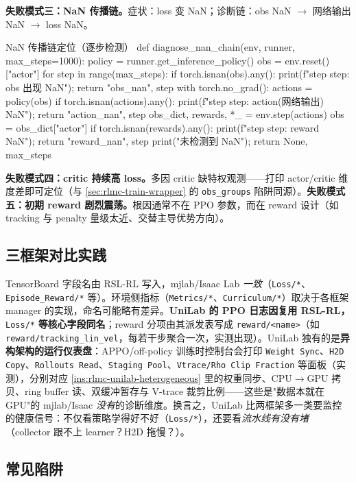 \textbf{失败模式三：NaN 传播链。}症状：loss 变 NaN；诊断链：obs NaN $\to$ 网络输出 NaN $\to$ loss NaN。

\begin{codebox}[Python]{NaN 传播链定位（逐步检测）}
def diagnose_nan_chain(env, runner, max_steps=1000):
    policy = runner.get_inference_policy()
    obs = env.reset()["actor"]
    for step in range(max_steps):
        if torch.isnan(obs).any():
            print(f"step {step}: obs 出现 NaN"); return "obs_nan", step
        with torch.no_grad():
            actions = policy(obs)
        if torch.isnan(actions).any():
            print(f"step {step}: action(网络输出) NaN"); return "action_nan", step
        obs_dict, rewards, *_ = env.step(actions)
        obs = obs_dict["actor"]
        if torch.isnan(rewards).any():
            print(f"step {step}: reward NaN"); return "reward_nan", step
    print("未检测到 NaN"); return None, max_steps
\end{codebox}

\textbf{失败模式四：critic 持续高 loss。}多因 critic 缺特权观测——打印 actor/critic 维度差即可定位（与 \cref{sec:rlmc-train-wrapper} 的 \verb|obs_groups| 陷阱同源）。\textbf{失败模式五：初期 reward 剧烈震荡。}根因通常不在 PPO 参数，而在 reward 设计（如 tracking 与 penalty 量级太近、交替主导优势方向）。

\subsection{三框架对比实践}

TensorBoard 字段名由 RSL-RL 写入，mjlab/Isaac Lab \emph{一致}（\verb|Loss/*|、\verb|Episode_Reward/*| 等）。环境侧指标（\verb|Metrics/*|、\verb|Curriculum/*|）取决于各框架 manager 的实现，命名可能略有差异。\textbf{UniLab 的 PPO 日志因复用 RSL-RL，} \verb|Loss/*| \textbf{等核心字段同名}；reward 分项由其派发表写成 \verb|reward/<name>|（如 \verb|reward/tracking_lin_vel|，每若干步聚合一次，实测出现）。UniLab 独有的是\textbf{异构架构的运行仪表盘}：APPO/off-policy 训练时控制台会打印 \verb|Weight Sync|、\verb|H2D Copy|、\verb|Rollouts Read|、\verb|Staging Pool|、\verb|Vtrace/Rho Clip Fraction| 等面板（实测），分别对应 \cref{ins:rlmc-unilab-heterogeneous} 里的权重同步、CPU$\to$GPU 拷贝、ring buffer 读、双缓冲暂存与 V-trace 裁剪比例——这些是"数据本就在 GPU"的 mjlab/Isaac \emph{没有}的诊断维度。换言之，UniLab 比两框架多一类要监控的健康信号：不仅看策略学得好不好（\verb|Loss/*|），还要看\emph{流水线有没有堵}（collector 跟不上 learner？H2D 拖慢？）。

\subsection{常见陷阱}

